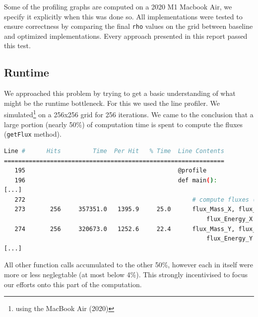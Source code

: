 \documentclass[a4paper,10pt]{article}
\begin{document}
Some of the profiling graphs are computed on a 2020 M1 Macbook Air, we specify it explicitly when this was done so.
All implementations were tested to ensure correctness by comparing the final \verb|rho| values on the grid between baseline and optimized implementations.
Every approach presented in this report passed this test.

\subsection{Runtime}
We approached this problem by trying to get a basic understanding of what might be the runtime bottleneck.
For this we used the line profiler.
We simulated\footnote{using the MacBook Air (2020)} on a 256x256 grid for 256 iterations.
We came to the conclusion that a large portion (nearly 50\%) of computation time is spent to compute the fluxes (\verb|getFlux| method).
\begin{lstlisting}[language=bash,basicstyle=\scriptsize\ttfamily]
Line #      Hits         Time  Per Hit   % Time  Line Contents
==============================================================
   195                                           @profile
   196                                           def main():
[...]
   272                                               # compute fluxes (local Lax-Friedrichs/Rusanov)
   273       256     357351.0   1395.9     25.0      flux_Mass_X, flux_Momx_X, flux_Momy_X,
                                                         flux_Energy_X = getFlux(...)
   274       256     320673.0   1252.6     22.4      flux_Mass_Y, flux_Momy_Y, flux_Momx_Y,
                                                         flux_Energy_Y = getFlux(...)
[...]
\end{lstlisting}
All other function calls accumulated to the other 50\%, however each in itself were more or less neglegtable (at most below 4\%).
This strongly incentivised to focus our efforts onto this part of the computation.
\end{document}
